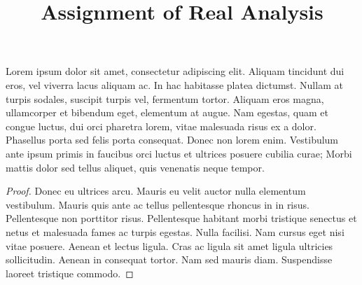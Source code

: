 \documentclass{article}
\title{Assignment of Real Analysis}
\theoremstyle{definition} \newtheorem{definition}{Definition}[section]
\theoremstyle{plain} \newtheorem{proposition}{Proposition}[section]
\theoremstyle{remark} \newtheorem{example}{Example}[section]
\theoremstyle{plain} \newtheorem{theorem}{Theorem}[section]
\newenvironment{tcbproblem}[1]{
    \begin{tcolorbox}[title = {Problem #1}]
    }{
    \end{tcolorbox}
}
\begin{document}
    \maketitle


    \begin{tcbproblem}{A2.1}
        Lorem ipsum dolor sit amet, consectetur adipiscing elit. Aliquam tincidunt dui eros, vel viverra lacus aliquam ac. In hac habitasse platea dictumst. Nullam at turpis sodales, suscipit turpis vel, fermentum tortor. Aliquam eros magna, ullamcorper et bibendum eget, elementum at augue. Nam egestas, quam et congue luctus, dui orci pharetra lorem, vitae malesuada risus ex a dolor. Phasellus porta sed felis porta consequat. Donec non lorem enim. Vestibulum ante ipsum primis in faucibus orci luctus et ultrices posuere cubilia curae; Morbi mattis dolor sed tellus aliquet, quis venenatis neque tempor.
    \end{tcbproblem}
    \begin{proof}[Proof]
        Donec eu ultrices arcu. Mauris eu velit auctor nulla elementum vestibulum. Mauris quis ante ac tellus pellentesque rhoncus in in risus. Pellentesque non porttitor risus. Pellentesque habitant morbi tristique senectus et netus et malesuada fames ac turpis egestas. Nulla facilisi. Nam cursus eget nisi vitae posuere. Aenean et lectus ligula. Cras ac ligula sit amet ligula ultricies sollicitudin. Aenean in consequat tortor. Nam sed mauris diam. Suspendisse laoreet tristique commodo.
    \end{proof}
\end{document}
